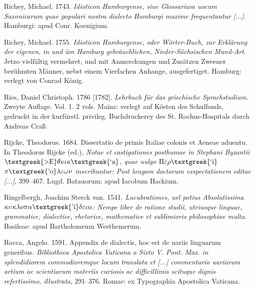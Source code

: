 \begin{styleStandard}
Richey, Michael. 1743. \textit{Idioticon Hamburgense, siue Glossarium uocum Saxonicarum quae populari nostra dialecto Hamburgi maxime frequentantur [...]}. Hamburgi: apud Conr. Koenigium.
\end{styleStandard}

\begin{styleStandard}
Richey, Michael. 1755. \textit{Idioticon Hamburgense, oder Wörter-Buch, zur Erklärung der eigenen, in und üm Hamburg gebräuchlichen, Nieder-Sächsischen Mund-Art}. Jetzo vielfältig vermehret, und mit Anmerckungen und Zusätzen Zweener berühmten Männer, nebst einem Vierfachen Anhange, ausgefertiget. Hamburg: verlegt von Conrad König.
\end{styleStandard}

\begin{styleStandard}
Ries, Daniel Christoph. 1786 [1782]. \textit{Lehrbuch für das griechische Sprachstudium}. Zweyte Auflage. Vol. 1. 2 vols. Mainz: verlegt auf Kösten des Schulfonds, gedruckt in der kurfürstl. privileg. Buchdruckerey des St. Rochus-Hospitals durch Andreas Craß.
\end{styleStandard}

\begin{styleStandard}
Rijcke, Theodorus. 1684. Dissertatio de primis Italiae colonis et Aeneae aduentu. In Theodorus Rijcke (ed.), \textit{Notae et castigationes posthumae in Stephani Byzantii $\text{\textgreek{>E}}\theta \nu \iota \kappa \text{\textgreek{`a}}$, quae uulgo $\Pi \varepsilon \rho \text{\textgreek{`i}}$ $\pi \text{\textgreek{'o}}\lambda \varepsilon \omega \nu $ inscribuntur: Post longam doctorum exspectationem editae [...]}, 399–467. Lugd. Batauorum: apud Iacobum Hackium.
\end{styleStandard}

\begin{styleStandard}
Ringelbergh, Joachim Sterck van. 1541. \textit{Lucubrationes, uel potius Absolutissima $\kappa \upsilon \kappa \lambda o\pi \alpha \text{\textgreek{'i}}\delta \varepsilon \iota \alpha $: Nempe liber de ratione studii, utriusque linguae, grammatice, dialectice, rhetorice, mathematice et sublimioris philosophiae multa}. Basileae: apud Bartholomeum Westhemerum.
\end{styleStandard}

\begin{styleStandard}
Rocca, Angelo. 1591. Appendix de dialectis, hoc est de uariis linguarum generibus. \textit{Bibliotheca Apostolica Vaticana a Sixto V. Pont. Max. in splendidiorem commodioremque locum translata et [...] commentario uariarum artium ac scientiarum materiis curiosis ac difficillimis scituque dignis refertissimo, illustrata}, 291–376. Romae: ex Typographia Apostolica Vaticana.
\end{styleStandard}


